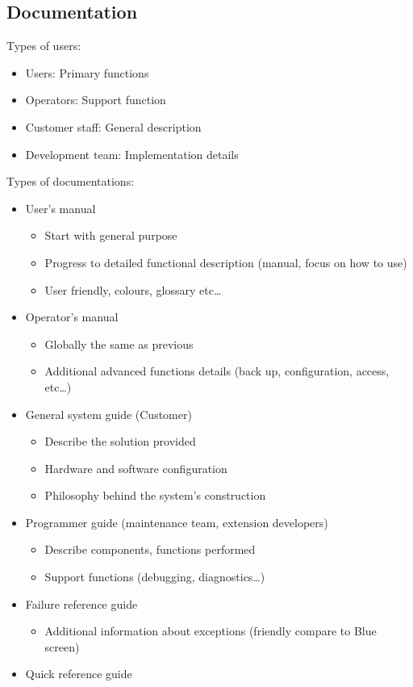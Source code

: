 \subsection{Documentation}

Types of users:

\begin{itemize}
    \item Users: Primary functions
    \item Operators: Support function
    \item Customer staff: General description
    \item Development team: Implementation details
\end{itemize}

Types of documentations:

\begin{itemize}
    \item User’s manual
        \begin{itemize}
            \item Start with general purpose
            \item Progress to detailed functional description (manual, focus on how to use)
            \item User friendly, colours, glossary etc\ldots
        \end{itemize}
    \item Operator’s manual
        \begin{itemize}
            \item Globally the same as previous
            \item Additional advanced functions details (back up, configuration, access, etc\ldots)
        \end{itemize}
    \item General system guide (Customer)
        \begin{itemize}
            \item Describe the solution provided
            \item Hardware and software configuration
            \item Philosophy behind the system’s construction
        \end{itemize}
    \item Programmer guide (maintenance team, extension developers)
        \begin{itemize}
            \item Describe components, functions performed
            \item Support functions (debugging, diagnostics\ldots)
        \end{itemize}
    \item Failure reference guide
        \begin{itemize}
            \item Additional information about exceptions (friendly compare to Blue screen)
        \end{itemize}
    \item Quick reference guide
\end{itemize}
